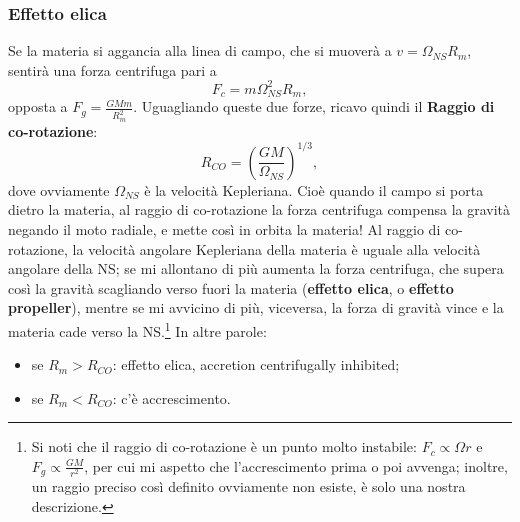 \subsubsection{Effetto elica}
Se la materia si aggancia alla linea di campo, che si muoverà a $v = \Omega_{NS}R_m $, sentirà una forza centrifuga pari a 
\begin{equation}
    F_c = m\Omega^2_{NS}R_m,
\end{equation}
opposta a $F_g = \frac{GMm}{R_m^2}$.
Uguagliando queste due forze, ricavo quindi il \textbf{Raggio di co-rotazione}:
\begin{equation}
    R_{CO}=\left( \frac{GM}{\Omega_{NS}} \right)^{1/3},
    \label{eq: raggio di corotazione}
\end{equation}
dove ovviamente $\Omega_{NS} $ è la velocità Kepleriana.
Cioè quando il campo si porta dietro la materia, al raggio di co-rotazione la forza centrifuga compensa la gravità negando il moto radiale, e mette così in orbita la materia!
Al raggio di co-rotazione, la velocità angolare Kepleriana della materia è uguale alla velocità angolare della NS; se mi allontano di più aumenta la forza centrifuga, che supera così la gravità scagliando verso fuori la materia (\textbf{effetto elica}, o \textbf{effetto propeller}), mentre se mi avvicino di più, viceversa, la forza di gravità vince e la materia cade verso la NS.\footnote{Si noti che il raggio di co-rotazione è un punto molto instabile: $F_c\propto \Omega r$ e $F_g\propto \frac{GM}{r^2} $, per cui mi aspetto che l'accrescimento prima o poi avvenga; inoltre, un raggio preciso così definito ovviamente non esiste, è solo una nostra descrizione.}
In altre parole:
\begin{itemize}
    \item se $R_m>R_{CO}$: effetto elica, accretion centrifugally inhibited;
    \item se $R_m<R_{CO}$: c'è accrescimento. 
\end{itemize}

